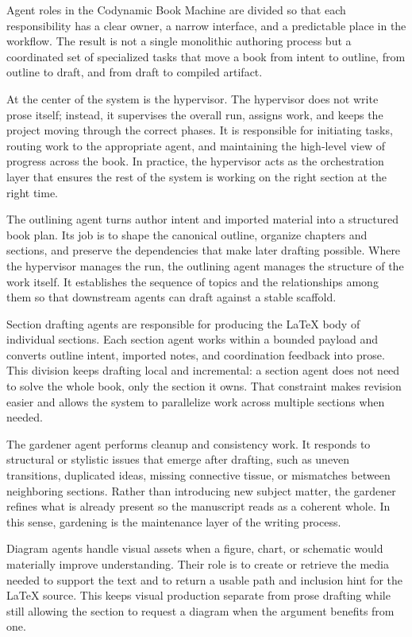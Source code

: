 Agent roles in the Codynamic Book Machine are divided so that each responsibility has a clear owner, a narrow interface, and a predictable place in the workflow. The result is not a single monolithic authoring process but a coordinated set of specialized tasks that move a book from intent to outline, from outline to draft, and from draft to compiled artifact.

At the center of the system is the hypervisor. The hypervisor does not write prose itself; instead, it supervises the overall run, assigns work, and keeps the project moving through the correct phases. It is responsible for initiating tasks, routing work to the appropriate agent, and maintaining the high-level view of progress across the book. In practice, the hypervisor acts as the orchestration layer that ensures the rest of the system is working on the right section at the right time.

The outlining agent turns author intent and imported material into a structured book plan. Its job is to shape the canonical outline, organize chapters and sections, and preserve the dependencies that make later drafting possible. Where the hypervisor manages the run, the outlining agent manages the structure of the work itself. It establishes the sequence of topics and the relationships among them so that downstream agents can draft against a stable scaffold.

Section drafting agents are responsible for producing the \LaTeX{} body of individual sections. Each section agent works within a bounded payload and converts outline intent, imported notes, and coordination feedback into prose. This division keeps drafting local and incremental: a section agent does not need to solve the whole book, only the section it owns. That constraint makes revision easier and allows the system to parallelize work across multiple sections when needed.

The gardener agent performs cleanup and consistency work. It responds to structural or stylistic issues that emerge after drafting, such as uneven transitions, duplicated ideas, missing connective tissue, or mismatches between neighboring sections. Rather than introducing new subject matter, the gardener refines what is already present so the manuscript reads as a coherent whole. In this sense, gardening is the maintenance layer of the writing process.

Diagram agents handle visual assets when a figure, chart, or schematic would materially improve understanding. Their role is to create or retrieve the media needed to support the text and to return a usable path and inclusion hint for the \LaTeX{} source. This keeps visual production separate from prose drafting while still allowing the section to request a diagram when the argument benefits from one.

